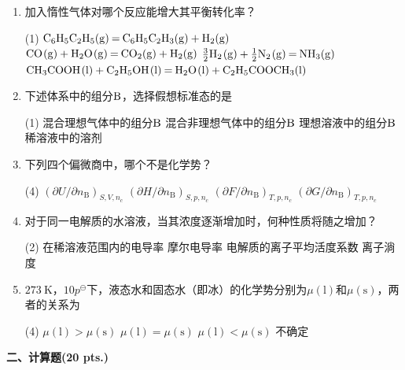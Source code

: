 \begin{enumerate}[label=\arabic*., itemsep=1.5ex]
    $\Delta_{\mathrm{vap}}A$等于
    \begin{tasks}(4)
        \task $23.48\ \mathrm{kJ}$
        \task $5.87\ \mathrm{kJ}$
        \task $2.94\ \mathrm{kJ}$
        \task $1.47\ \mathrm{kJ}$
    \end{tasks}
    \item 加入惰性气体对哪个反应能增大其平衡转化率？
    \begin{tasks}(1)
        \task $\ce{C6H5C2H5(g) = C6H5C2H3(g) + H2(g)}$
        \task $\ce{CO(g) + H2O(g) = CO2(g) + H2(g)}$
        \task $\ce{\frac{3}{2}H2(g) + \frac{1}{2}N2(g) = NH3(g)}$
        \task $\ce{CH3COOH(l) + C2H5OH(l) = H2O(l) + C2H5COOCH3(l)}$
    \end{tasks}
    \item 下述体系中的组分$\ce{B}$，选择假想标准态的是
    \begin{tasks}(1)
        \task 混合理想气体中的组分$\ce{B}$
        \task 混合非理想气体中的组分$\ce{B}$
        \task 理想溶液中的组分$\ce{B}$
        \task 稀溶液中的溶剂
    \end{tasks}
    \item 下列四个偏微商中，哪个不是化学势？
    \begin{tasks}(4)
        \task $(\partial U/\partial n_\mathrm{B})_{S,V,n_c}$
        \task $(\partial H/\partial n_\mathrm{B})_{S,p,n_c}$
        \task $(\partial F/\partial n_\mathrm{B})_{T,p,n_c}$
        \task $(\partial G/\partial n_\mathrm{B})_{T,p,n_c}$
    \end{tasks}
    \item 对于同一电解质的水溶液，当其浓度逐渐增加时，何种性质将随之增加？
    \begin{tasks}(2)
        \task 在稀溶液范围内的电导率
        \task 摩尔电导率
        \task 电解质的离子平均活度系数
        \task 离子淌度
    \end{tasks}
    \item $273\ \mathrm{K}$，$10p^\ominus$下，液态水和固态水（即冰）的化学势分别为$\mu(\mathrm{l})$和$\mu(\mathrm{s})$，两者的关系为
    \begin{tasks}(4)
        \task $\mu(\mathrm{l}) > \mu(\mathrm{s})$
        \task $\mu(\mathrm{l}) = \mu(\mathrm{s})$
        \task $\mu(\mathrm{l}) < \mu(\mathrm{s})$
        \task 不确定
    \end{tasks}
\end{enumerate}

\vspace{0.5cm}
\noindent\textbf{二、计算题(20 pts.)}

